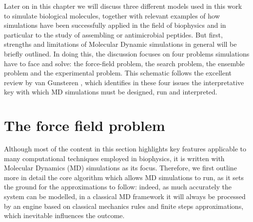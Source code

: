 Later on in this chapter we will discuss three different models used in this work to simulate biological molecules, together with relevant examples of how simulations have been successfully applied in the field of biophysics and in particular to the study of assembling or antimicrobial peptides.
%
But first, strengths and limitations of Molecular Dynamic simulations in general will be briefly outlined. In doing this, the discussion focuses on four problems simulations have to face and solve: the force-field problem, the search problem, the ensemble problem and the experimental problem. This schematic follows the excellent review by van Gunsteren \cite{...}, which identifies in these four issues the interpretative key with which MD simulations must be designed, run and interpreted.


\section{The force field problem}


Although most of the content in this section highlights key features applicable to many computational techniques employed in biophysics, it is written with Molecular Dynamics (MD) simulations as its focus. Therefore, we first outline more in detail the core algorithm which allows MD simulations to run, as it sets the ground for the approximations to follow: indeed, as much accurately the system can be modelled, in a classical MD framework it will always be processed by an engine based on classical mechanics rules and finite steps approximations, which inevitable influences the outcome.

